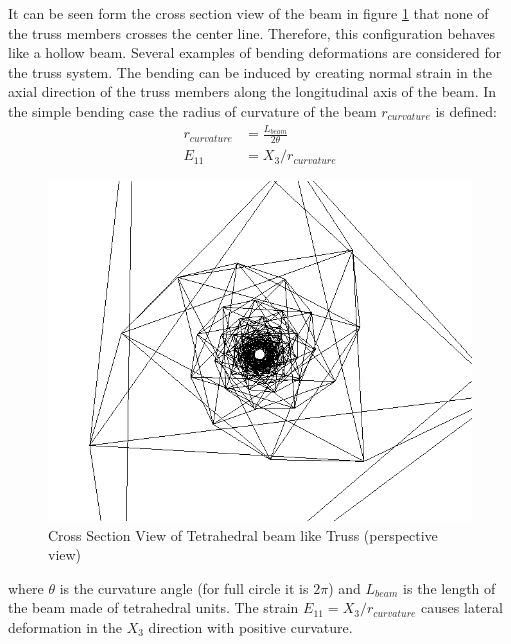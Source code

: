 It can be seen form the cross section view of the beam in figure \ref{fig:refrence_shap_100_tetra_unit_tetrahedral_unit_cross_section_view} that none of the truss members crosses the center line.   
Therefore, this configuration behaves like a hollow beam. 
Several examples of bending deformations are considered for the truss system.
The bending can be induced by creating normal strain in the axial direction of the truss members along the longitudinal axis of the beam.
In the simple bending case the radius of curvature of the beam $r_{curvature}$ is defined:
\begin{equation}
\begin{aligned}
r_{curvature}&=\frac{ L_{beam} }{2 \theta}\\
E_{11}&=X_3/r_{curvature}
\end{aligned}
\label{stran_and_radios_of_curvture_of_beam:eqn}
\end{equation}

\begin{figure} 
\centering
\includegraphics[width=5.0in]{./chap_5_active_trusses/images_linear_tetrahedral/refrence_shap_100_tetra_unit_tetrahedral_unit_cross_section_view.png}
\caption{Cross Section View of Tetrahedral beam like Truss (perspective view)}
\label{fig:refrence_shap_100_tetra_unit_tetrahedral_unit_cross_section_view}
\end{figure}

where 
$\theta$ is the curvature angle (for full circle it is $2\pi$) and
$ L_{beam}$ is the length of the beam made of tetrahedral units.
The strain $E_{11}=X_3/r_{curvature}$ causes lateral deformation in the $X_3$ direction with positive curvature.

